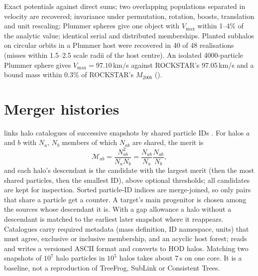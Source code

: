 \begin{validation}
Exact potentials against direct sums; two overlapping populations separated in velocity are recovered; invariance under permutation, rotation,
boosts, translation and unit rescaling; Plummer spheres give one object with $V_{\max}$ within 1--4\% of the analytic value; identical serial
and distributed memberships. Planted subhalos on circular orbits in a Plummer host were recovered in 40 of 48 realisations (misses within
1.5--2.5 scale radii of the host centre). An isolated 4000-particle Plummer sphere gives $V_{\max}=97.10$\,km/s against ROCKSTAR's 97.05\,km/s and
a bound mass within 0.3\% of ROCKSTAR's $M_{200b}$ ().
\end{validation}

\section{Merger histories}\label{sec:halo-history}

 links halo catalogues of successive snapshots by shared particle IDs \cite{Srisawat2013,Elahi2019}. For halos $a$ and $b$
with $N_a$, $N_b$ members of which $N_{ab}$ are shared, the merit is
\begin{equation}
\mathcal M_{ab}=\frac{N_{ab}^2}{N_aN_b}=\frac{N_{ab}}{N_a}\frac{N_{ab}}{N_b},
\end{equation}
and each halo's descendant is the candidate with the largest merit (then the most shared particles, then the smallest ID), above optional
thresholds; all candidates are kept for inspection. Sorted particle-ID indices are merge-joined, so only pairs that share a particle get a
counter. A target's main progenitor is chosen among the sources whose descendant it is. With a gap allowance a halo without a descendant is
matched to the earliest later snapshot where it reappears. Catalogues carry required metadata (mass definition, ID namespace, units) that must
agree, exclusive or inclusive membership, and an acyclic host forest;  reads and writes a versioned ASCII format and
converts to HOD halos. Matching two snapshots of $10^7$ halo particles in $10^5$ halos takes about 7\,s on one core. It is a baseline, not a
reproduction of TreeFrog, SubLink or Consistent Trees.
